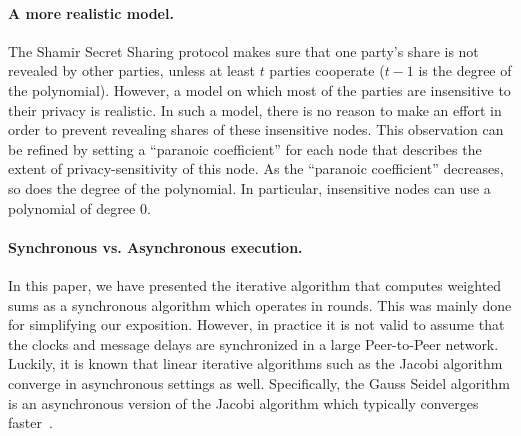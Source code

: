 \documentclass[10pt]{svjour3}
\begin{document}
\paragraph{A more realistic model.}
The Shamir Secret Sharing protocol makes sure that one party's share
is not revealed by other parties, unless at least $t$ parties
cooperate ($t-1$ is the degree of the polynomial). However, a model on
which most of the parties are insensitive to their privacy is
realistic. In such a model, there is no reason to make an effort in
order to prevent revealing shares of these insensitive nodes. This
observation can be refined by setting a ``paranoic coefficient'' for
each node that describes the extent of privacy-sensitivity of this
node. As the ``paranoic coefficient'' decreases, so does the degree of
the polynomial. In particular, insensitive nodes can use a polynomial
of degree $0$.



\paragraph{Synchronous vs. Asynchronous execution.}
In this paper, we have presented the iterative algorithm that computes
weighted sums as a synchronous algorithm which operates in rounds.
This was mainly done for simplifying our exposition.
However, in practice it is not  valid to assume  that the clocks and message delays are synchronized in
a large Peer-to-Peer network. Luckily, it is known that linear
iterative algorithms such as the Jacobi algorithm
converge in asynchronous settings as well. Specifically, the Gauss Seidel algorithm
is an asynchronous version of the Jacobi algorithm which typically converges faster~\cite{BibDB:BookBertsekasTsitsiklis}.
\end{document}
